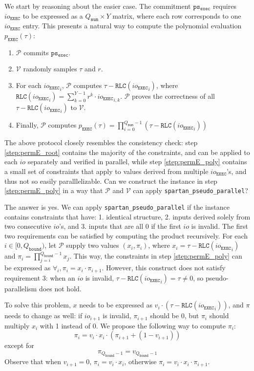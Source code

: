 \documentclass{article}
\newcommand{\code}{\texttt}
\newcommand{\Qbound}{Q_{\mathtt{bound}}}
\newcommand{\Qsum}{Q_{\mathtt{sum}}}
\renewcommand{\P}{\mathcal{P}}
\newcommand{\V}{\mathcal{V}}
\newcommand{\RLC}{\mathtt{RLC}}
\newcommand{\ioe}{io_{\mathtt{EXEC}}}
\newcommand{\pse}{\mathtt{ps_{exec}}}
\begin{document}
We start by reasoning about the easier case. The commitment $\pse$ requires $\ioe$ to be expressed as a $\Qsum\times Y$ matrix, where each row corresponds to one $\ioe$ entry. This presents a natural way to compute the polynomial evaluation $p_\mathtt{EXEC}(\tau)$:
\begin{enumerate}
    \item $\P$ commits $\pse$.
    \item $\V$ randomly samples $\tau$ and $r$.
    \item \label{step:permE_root} For each ${\ioe}_i$, $\P$ computes $\tau - \RLC({\ioe}_i)$, where $\RLC({\ioe}_i) = \sum_{k = 0}^{Y-1} r^k \cdot {\ioe}_{i, k}$. $\P$ proves the correctness of all $\tau - \RLC({\ioe}_i)$ to $\V$.
    \item \label{step:permE_poly} Finally, $\P$ computes $p_\mathtt{EXEC}(\tau) = \prod_{i = 0}^{\Qsum - 1}(\tau - \RLC({\ioe}_i))$
\end{enumerate}

The above protocol closely resembles the consistency check: step \ref{step:permE_root} contains the majority of the constraints, and can be applied to each $io$ separately and verified in parallel, while step \ref{step:permE_poly} contains a small set of constraints that apply to values derived from multiple $\ioe$'s, and thus not so easily paralllelizable. Can we construct the instance in step \ref{step:permE_poly} in a way that $\P$ and $\V$ can apply \code{spartan\_pseudo\_parallel}?

The answer is yes. We can apply \code{spartan\_pseudo\_parallel} if the instance contains constraints that have: 1. identical structure, 2. inputs derived solely from two consecutive $io$'s, and 3. inputs that are all 0 if the first $io$ is invalid. The first two requirements can be satisfied by computing the product recursively. For each $i\in[0, \Qbound)$, let $\P$ supply two values $(x_i, \pi_i)$, where $x_i = \tau - \RLC({\ioe}_i)$ and $\pi_i = \prod_{j = i}^{\Qbound - 1} x_j$. This way, the constraints in step \ref{step:permE_poly} can be expressed as $\forall_i, \pi_i = x_i \cdot \pi_{i+1}$. However, this construct does not satisfy requirement 3: when an $io$ is invalid, $\tau - \RLC({\ioe}_i) = \tau\neq 0$, so pseudo-parallelism does not hold.

To solve this problem, $x$ needs to be expressed as $v_i \cdot (\tau - \RLC({\ioe}_i))$, and $\pi$ needs to change as well: if $io_{i + 1}$ is invalid, $\pi_{i + 1}$ should be 0, but $\pi_i$ should multiply $x_i$ with 1 instead of 0. We propose the following way to compute $\pi_i$:
$$\pi_i = v_i \cdot x_i \cdot (\pi_{i+1} + (1 - v_{i+1}))$$
except for
$$\pi_{\Qbound - 1} = v_{\Qbound - 1}$$
Observe that when $v_{i+1} = 0$, $\pi_i = v_i \cdot x_i$, otherwise $\pi_i = v_i \cdot x_i \cdot \pi_{i+1}$.
\end{document}
